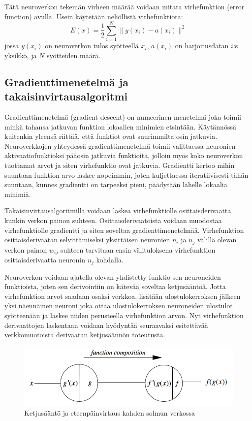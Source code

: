 \documentclass[finnish]{tktltiki2}
\theoremstyle{definition}
\theoremstyle{remark}
\begin{document}
  Tätä neuroverkon tekemän virheen määrää voidaan mitata virhefunktion (error function) avulla. Usein käytetään neliöllistä virhefunktiota:
    $$E(x) = \frac{1}{2} \sum_{i=1}^{N} \| y(x_i)-a(x_i) \|^2$$
  jossa $y(x_i)$ on neuroverkon tulos syötteellä $x_i$, $a(x_i)$ on harjoitusdatan $i$:s yksikkö, ja $N$ syötteiden määrä.


  \subsection{Gradienttimenetelmä ja takaisinvirtausalgoritmi}
  Gradienttimenetelmä (gradient descent) on numeerinen menetelmä joka toimii minkä tahansa jatkuvan funktion lokaalien minimien etsintään. Käytännössä kuitenkin yleensä riittää, että funktiot ovat suurimmilta osin jatkuvia. Neuroverkkojen yhteydessä gradienttimenetelmä toimii valittaessa neuronien aktivaatiofunktioksi pääosin jatkuvia funktioita, jolloin myös koko neuroverkon tuottamat arvot ja siten virhefunktio ovat jatkuvia. Gradientti kertoo mihin suuntaan funktion arvo laskee nopeimmin, joten kuljettaessa iteratiivisesti tähän suuntaan, kunnes gradientti on tarpeeksi pieni, päädytään lähelle lokaalia minimiä.

  Takaisinvirtausalgoritmilla voidaan laskea virhefunktiolle osittaisderivaatta kunkin verkon painon suhteen. Osittaisderivaatoista voidaan muodostaa virhefunktiolle gradientti ja siten soveltaa gradienttimenetelmää. Virhefunktion osittaisderivaatan selvittämiseksi yksittäisen neuronien $n_i$ ja $n_j$ välillä olevan verkon painon $w_{ij}$ suhteen  tarvitaan ensin välituloksena virhefunktion osittaisderivaatta neuronin $n_j$ kohdalla. 

  Neuroverkon voidaan ajatella olevan yhdistetty funktio sen neuroneiden funktioista, joten sen derivointiin on kätevää soveltaa ketjusääntöä. Jotta virhefunktion arvot saadaan osaksi verkkoa, lisätään ulostulokerroksen jälkeen yksi näennäinen neuroni joka ottaa ulostulokerroksen neuroneiden ulostulot syötteenään ja laskee niiden perusteella virhefunktion arvon. Nyt virhefunktion derivaattojen laskentaan voidaan hyödyntää seuraavaksi esitettävää verkkomuotoista derivaatan ketjusäännön toteutusta. 
    
  \begin{figure}[h]
    \label{pic:composition}
    \centering
    \includegraphics[scale=0.5]{function-composition}
    \caption{Ketjusääntö ja eteenpäinvirtaus kahden solmun verkossa \cite{Rojas96}}
  \end{figure}
\end{document}
